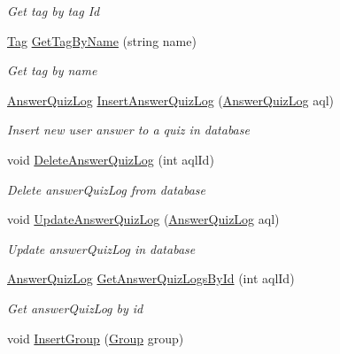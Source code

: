 \begin{DoxyCompactItemize}
\begin{DoxyCompactList}\small\item\em Get tag by tag Id \end{DoxyCompactList}\item 
\hyperlink{class_website_1_1_models_1_1_tag}{Tag} \hyperlink{class_website_1_1_models_1_1_d_a_l_e_f_a677c7c47919a6d5c3fac410c791f2038}{Get\+Tag\+By\+Name} (string name)
\begin{DoxyCompactList}\small\item\em Get tag by name \end{DoxyCompactList}\item 
\hyperlink{class_website_1_1_models_1_1_answer_quiz_log}{Answer\+Quiz\+Log} \hyperlink{class_website_1_1_models_1_1_d_a_l_e_f_a8a0d8cd26c006cc3e716280cddaab0c4}{Insert\+Answer\+Quiz\+Log} (\hyperlink{class_website_1_1_models_1_1_answer_quiz_log}{Answer\+Quiz\+Log} aql)
\begin{DoxyCompactList}\small\item\em Insert new user answer to a quiz in database \end{DoxyCompactList}\item 
void \hyperlink{class_website_1_1_models_1_1_d_a_l_e_f_a991ff5edc0f712fc26b97f023ee3f0a9}{Delete\+Answer\+Quiz\+Log} (int aql\+Id)
\begin{DoxyCompactList}\small\item\em Delete answer\+Quiz\+Log from database \end{DoxyCompactList}\item 
void \hyperlink{class_website_1_1_models_1_1_d_a_l_e_f_addf3316478caf566b119b7ef588d678b}{Update\+Answer\+Quiz\+Log} (\hyperlink{class_website_1_1_models_1_1_answer_quiz_log}{Answer\+Quiz\+Log} aql)
\begin{DoxyCompactList}\small\item\em Update answer\+Quiz\+Log in database \end{DoxyCompactList}\item 
\hyperlink{class_website_1_1_models_1_1_answer_quiz_log}{Answer\+Quiz\+Log} \hyperlink{class_website_1_1_models_1_1_d_a_l_e_f_a6e22ce519f866b56f78a8c08a400dcfd}{Get\+Answer\+Quiz\+Logs\+By\+Id} (int aql\+Id)
\begin{DoxyCompactList}\small\item\em Get answer\+Quiz\+Log by id \end{DoxyCompactList}\item 
void \hyperlink{class_website_1_1_models_1_1_d_a_l_e_f_a75600afdf2212248bfea7f8032d8f949}{Insert\+Group} (\hyperlink{class_website_1_1_models_1_1_group}{Group} group)

\end{DoxyCompactItemize}
